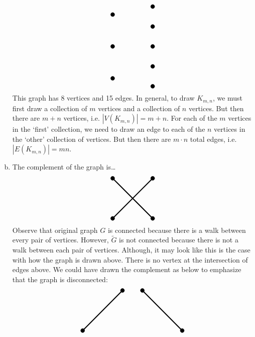 \documentclass[11pt,letterpaper]{article}
\begin{document}
\begin{enumerate}[(a)]
\[\begin{tikzpicture}[scale=1]
	\draw[fill=black] (0,0.4) circle (0.1); 
	\draw[fill=black] (0,2.0) circle (0.1); 
	\draw[fill=black] (0,3.6) circle (0.1); 
	
	\draw[fill=black] (2,0) circle (0.1); 
	\draw[fill=black] (2,1) circle (0.1); 	
	\draw[fill=black] (2,2) circle (0.1); 
	\draw[fill=black] (2,3) circle (0.1); 
	\draw[fill=black] (2,4) circle (0.1); 
	\end{tikzpicture}
	\]
This graph has 8 vertices and 15 edges. In general, to draw $K_{m,n}$, we must first draw a collection of $m$ vertices and a collection of $n$ vertices. But then there are $m + n$ vertices, i.e. $|V(K_{m,n})|= m + n$. For each of the $m$ vertices in the `first' collection, we need to draw an edge to each of the $n$ vertices in the `other' collection of vertices. But then there are $m \cdot n$ total edges, i.e. $|E(K_{m,n})|= mn$. \pspace

\item The complement of the graph is\dots
	\[
	\begin{tikzpicture}[scale=2]
	\draw[line width= 0.05cm] (0,0) -- (1,1);
	\draw[line width= 0.05cm] (0,1) -- (1,0);
	
	\draw[fill=black] (0,0) circle (0.05); 
	\draw[fill=black] (1,0) circle (0.05); 
	\draw[fill=black] (1,1) circle (0.05); 
	\draw[fill=black] (0,1) circle (0.05); 
	\end{tikzpicture}
	\]
Observe that original graph $G$ is connected because there is a walk between every pair of vertices. However, $\widetilde{G}$ is not connected because there is not a walk between each pair of vertices. Although, it may look like this is the case with how the graph is drawn above. There is no vertex at the intersection of edges above. We could have drawn the complement as below to emphasize that the graph is disconnected:
	\[
	\begin{tikzpicture}[scale=2]
	\draw[line width= 0.05cm] (0,0) -- (1,1);
	\draw[line width= 0.05cm] (1.5,1) -- (2.5,0);
	
	\draw[fill=black] (0,0) circle (0.05); 
	\draw[fill=black] (1.5,1) circle (0.05); 
	\draw[fill=black] (1,1) circle (0.05); 
	\draw[fill=black] (2.5,0) circle (0.05); 
	\end{tikzpicture}
	\]
\end{enumerate}



\newpage
\end{document}
